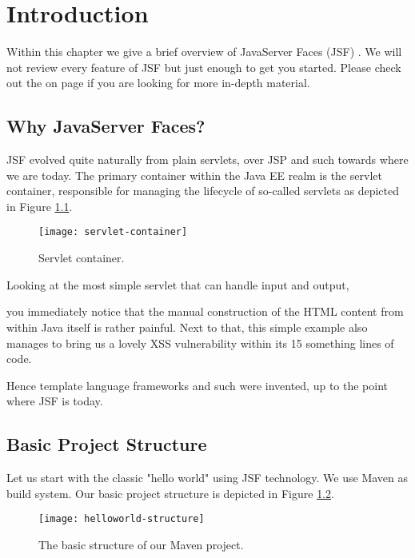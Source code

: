 %

\chapter{Introduction}
\label{chap:introduction}
Within this chapter we give a brief overview of JavaServer Faces (JSF) \cite{JSF23}.
We will not review every feature of JSF but just enough to get you started.
Please check out the  on page \pageref{chap:references} if you are looking for more in-depth material.

\section{Why JavaServer Faces?}
JSF evolved quite naturally from plain servlets, over JSP and such towards where we are today.
The primary container within the Java EE realm is the servlet container, responsible for managing the lifecycle of so-called servlets as depicted in Figure \ref{fig:servlet-container}.
\begin{figure}[htbp]
	\begin{center}
		\texttt{[image: servlet-container]}
		\caption{Servlet container.}
		\label{fig:servlet-container}
	\end{center}
\end{figure}
Looking at the most simple servlet that can handle input and output,

you immediately notice that the manual construction of the HTML content from within Java itself is rather painful.
Next to that, this simple example also manages to bring us a lovely XSS vulnerability within its 15 something lines of code.

Hence template language frameworks and such were invented, up to the point where JSF is today.


\section{Basic Project Structure}
Let us start with the classic "hello world" using JSF technology.
We use Maven \cite{ApacheMaven} as build system.
Our basic project structure is depicted in Figure \ref{fig:helloworld-structure}.
\begin{figure}[htbp]
	\begin{center}
		\texttt{[image: helloworld-structure]}
		\caption{The basic structure of our Maven project.}
		\label{fig:helloworld-structure}
	\end{center}
\end{figure}

